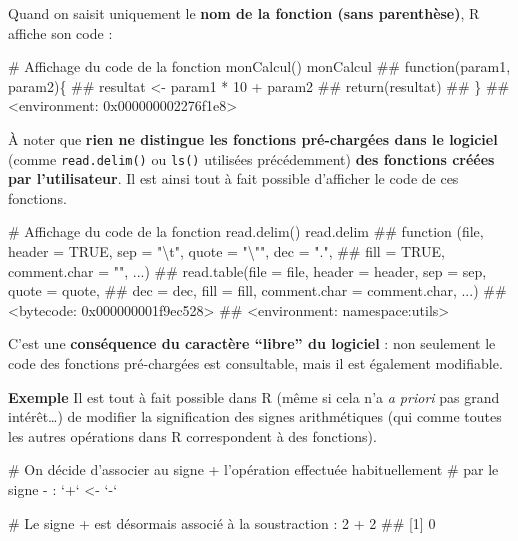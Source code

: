 \documentclass[12pt,twosided, notitlepage]{book}
\newenvironment{Shaded}{}{}
\newcommand{\CommentTok}[1]{\textcolor[rgb]{0.00,0.50,0.00}{#1}}
\newcommand{\DataTypeTok}[1]{#1}
\newcommand{\DecValTok}[1]{#1}
\newcommand{\NormalTok}[1]{#1}
\newcommand{\OperatorTok}[1]{#1}
\newcommand{\StringTok}[1]{\textcolor[rgb]{0.00,0.50,0.50}{#1}}
\renewenvironment{Shaded}{\begin{snugshade}}{\end{snugshade}}
\begin{document}
Quand on saisit uniquement le \textbf{nom de la fonction (sans
parenthèse)}, R affiche son code :

\begin{Shaded}
\begin{Highlighting}[]
\CommentTok{# Affichage du code de la fonction monCalcul()}
\NormalTok{monCalcul}
\NormalTok{  ## function(param1, param2)\{}
\NormalTok{  ##   resultat <- param1 * 10 + param2}
\NormalTok{  ##   return(resultat)}
\NormalTok{  ## \}}
\NormalTok{  ## <environment: 0x000000002276f1e8>}
\end{Highlighting}
\end{Shaded}

À noter que \textbf{rien ne distingue les fonctions pré-chargées dans le
logiciel} (comme \texttt{read.delim()} ou \texttt{ls()} utilisées
précédemment) \textbf{des fonctions créées par l'utilisateur}. Il est
ainsi tout à fait possible d'afficher le code de ces
fonctions.

\begin{Shaded}
\begin{Highlighting}[]
\CommentTok{# Affichage du code de la fonction read.delim()}
\NormalTok{read.delim}
\NormalTok{  ## function (file, header = TRUE, sep = "\textbackslash{}t", quote = "\textbackslash{}"", dec = ".", }
\NormalTok{  ##     fill = TRUE, comment.char = "", ...) }
\NormalTok{  ## read.table(file = file, header = header, sep = sep, quote = quote, }
\NormalTok{  ##     dec = dec, fill = fill, comment.char = comment.char, ...)}
\NormalTok{  ## <bytecode: 0x000000001f9ec528>}
\NormalTok{  ## <environment: namespace:utils>}
\end{Highlighting}
\end{Shaded}

C'est une \textbf{conséquence du caractère \enquote{libre} du logiciel}
: non seulement le code des fonctions pré-chargées est consultable, mais
il est également modifiable.

\textbf{Exemple} Il est tout à fait possible dans R (même si cela n'a
\emph{a priori} pas grand intérêt\ldots{}) de modifier la signification
des signes arithmétiques (qui comme toutes les autres opérations dans R
correspondent à des fonctions).

\begin{Shaded}
\begin{Highlighting}[]
\CommentTok{# On décide d'associer au signe + l'opération effectuée habituellement }
\CommentTok{# par le signe - :}
\StringTok{`}\DataTypeTok{+}\StringTok{`}\NormalTok{ <-}\StringTok{ `}\DataTypeTok{-}\StringTok{`}

\CommentTok{# Le signe + est désormais associé à la soustraction :}
\DecValTok{2} \OperatorTok{+}\StringTok{ }\DecValTok{2}
\NormalTok{  ## [1] 0}
\end{Highlighting}
\end{Shaded}
\end{document}
